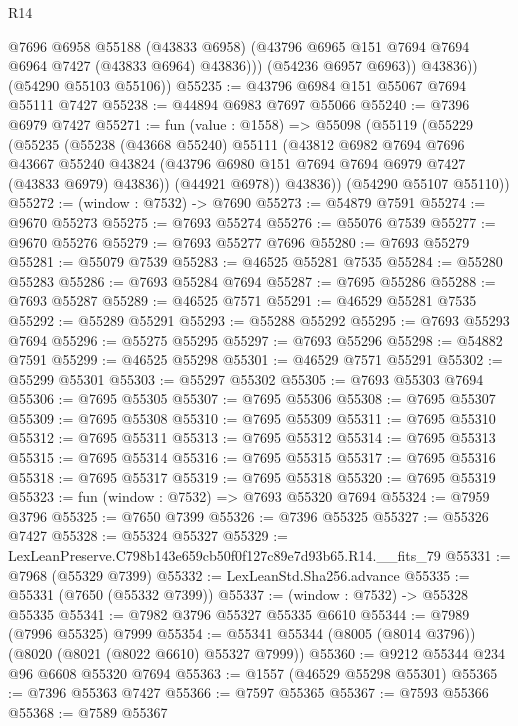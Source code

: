 \begin{lexlean}{R14}
\begin{coremodule}
                @7696
                @6958
                @55188
                (@43833 @6958)
                (@43796 @6965 @151 @7694 @7694 @6964 @7427 (@43833 @6964) @43836)))
            (@54236 @6957 @6963))
          @43836))
      (@54290 @55103 @55106))
@55235 := @43796 @6984 @151 @55067 @7694 @55111 @7427
@55238 := @44894 @6983 @7697 @55066
@55240 := @7396 @6979 @7427
@55271 := fun (value : @1558) =>
  @55098
    (@55119
      (@55229
        (@55235
          (@55238
            (@43668 @55240)
            @55111
            (@43812
              @6982
              @7694
              @7696
              @43667
              @55240
              @43824
              (@43796 @6980 @151 @7694 @7694 @6979 @7427 (@43833 @6979) @43836))
            (@44921 @6978))
          @43836))
      (@54290 @55107 @55110))
@55272 := (window : @7532) -> @7690
@55273 := @54879 @7591
@55274 := @9670 @55273
@55275 := @7693 @55274
@55276 := @55076 @7539
@55277 := @9670 @55276
@55279 := @7693 @55277 @7696
@55280 := @7693 @55279
@55281 := @55079 @7539
@55283 := @46525 @55281 @7535
@55284 := @55280 @55283
@55286 := @7693 @55284 @7694
@55287 := @7695 @55286
@55288 := @7693 @55287
@55289 := @46525 @7571
@55291 := @46529 @55281 @7535
@55292 := @55289 @55291
@55293 := @55288 @55292
@55295 := @7693 @55293 @7694
@55296 := @55275 @55295
@55297 := @7693 @55296
@55298 := @54882 @7591
@55299 := @46525 @55298
@55301 := @46529 @7571 @55291
@55302 := @55299 @55301
@55303 := @55297 @55302
@55305 := @7693 @55303 @7694
@55306 := @7695 @55305
@55307 := @7695 @55306
@55308 := @7695 @55307
@55309 := @7695 @55308
@55310 := @7695 @55309
@55311 := @7695 @55310
@55312 := @7695 @55311
@55313 := @7695 @55312
@55314 := @7695 @55313
@55315 := @7695 @55314
@55316 := @7695 @55315
@55317 := @7695 @55316
@55318 := @7695 @55317
@55319 := @7695 @55318
@55320 := @7695 @55319
@55323 := fun (window : @7532) => @7693 @55320 @7694
@55324 := @7959 @3796
@55325 := @7650 @7399
@55326 := @7396 @55325
@55327 := @55326 @7427
@55328 := @55324 @55327
@55329 := LexLeanPreserve.C798b143e659cb50f0f127c89e7d93b65.R14.__fits_79
@55331 := @7968 (@55329 @7399)
@55332 := LexLeanStd.Sha256.advance
@55335 := @55331 (@7650 (@55332 @7399))
@55337 := (window : @7532) -> @55328 @55335
@55341 := @7982 @3796 @55327 @55335 @6610
@55344 := @7989 (@7996 @55325) @7999
@55354 := @55341 @55344 (@8005 (@8014 @3796)) (@8020 (@8021 (@8022 @6610) @55327 @7999))
@55360 := @9212 @55344 @234 @96 @6608 @55320 @7694
@55363 := @1557 (@46529 @55298 @55301)
@55365 := @7396 @55363 @7427
@55366 := @7597 @55365
@55367 := @7593 @55366
@55368 := @7589 @55367

\end{coremodule}
\end{lexlean}
